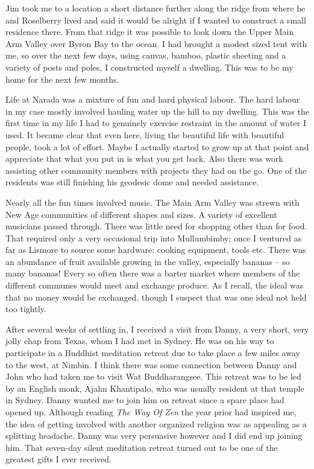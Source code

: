 Jim took me to a location a short distance further along the ridge from where he
and Roselberry lived and said it would be alright if I wanted to
construct a small residence there. From that ridge it was possible to
look down the Upper Main Arm Valley over Byron Bay to the ocean. I had
brought a modest sized tent with me, so over the next few days, using
canvas, bamboo, plastic sheeting and a variety of posts and poles, I
constructed myself a dwelling. This was to be my home for the next few
months.

Life at Narada was a mixture of fun and hard physical labour. The hard
labour in my case mostly involved hauling water up the hill to my
dwelling. This was the first time in my life I had to genuinely exercise
restraint in the amount of water I used. It became clear that even here,
living the beautiful life with beautiful people, took a lot of effort.
Maybe I actually started to grow up at that point and appreciate that
what you put in is what you get back. Also there was work assisting other
community members with projects they had on the go. One of the residents
was still finishing his geodesic dome and needed assistance.

Nearly all the fun times involved music. The Main Arm Valley was strewn
with New Age communities of different shapes and sizes. A variety of
excellent musicians passed through. There was little need for shopping
other than for food. That required only a very occasional trip into
Mullumbimby; once I ventured as far as Lismore to source some hardware:
cooking equipment, tools etc. There was an abundance of fruit available
growing in the valley, especially bananas -- so many bananas! Every so
often there was a barter market where members of the different communes
would meet and exchange produce. As I recall, the ideal was that no
money would be exchanged, though I suspect that was one ideal not held
too tightly.

After several weeks of settling in, I received a visit from Danny, a
very short, very jolly chap from Texas, whom I had met in Sydney. He was
on his way to participate in a Buddhist meditation retreat due to take
place a few miles away to the west, at Nimbin. I think there was some
connection between Danny and John who had taken me to visit Wat
Buddharangsee. This retreat was to be led by an English monk, Ajahn
Khantipalo, who was usually resident at that temple in Sydney. Danny
wanted me to join him on retreat since a spare place had opened up.
Although reading \emph{The Way Of Zen} the year prior had inspired me,
the idea of getting involved with another organized religion was as
appealing as a splitting headache. Danny was very persuasive however and
I did end up joining him. That seven-day silent meditation retreat
turned out to be one of the greatest gifts I ever received.

